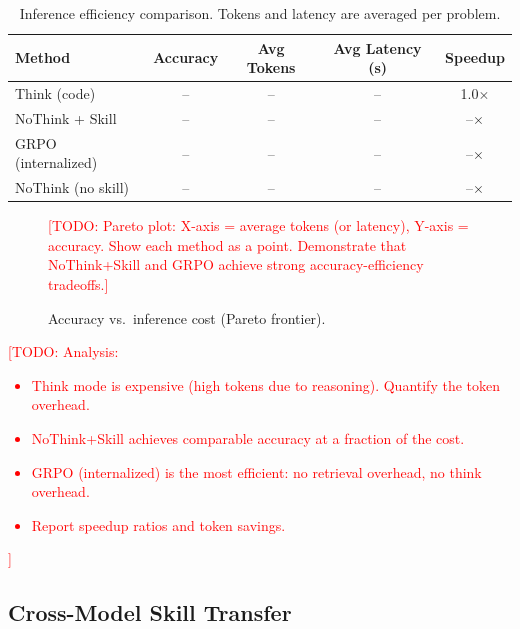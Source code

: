 \documentclass[11pt]{article}
\newcommand{\todo}[1]{\textcolor{red}{[TODO: #1]}}
\begin{document}

\begin{table}[t]
\centering
\caption{Inference efficiency comparison. Tokens and latency are averaged per problem.}
\label{tab:efficiency}
\small
\begin{tabular}{@{}lcccc@{}}
\toprule
\textbf{Method} & \textbf{Accuracy} & \textbf{Avg Tokens} & \textbf{Avg Latency (s)} & \textbf{Speedup} \\
\midrule
Think (code)          & -- & -- & -- & 1.0$\times$ \\
NoThink + Skill       & -- & -- & -- & --$\times$ \\
GRPO (internalized)   & -- & -- & -- & --$\times$ \\
NoThink (no skill)    & -- & -- & -- & --$\times$ \\
\bottomrule
\end{tabular}
\end{table}

\begin{figure}[t]
\centering
\todo{Pareto plot: X-axis = average tokens (or latency), Y-axis = accuracy. Show each method as a point. Demonstrate that NoThink+Skill and GRPO achieve strong accuracy-efficiency tradeoffs.}
\caption{Accuracy vs.\ inference cost (Pareto frontier).}
\label{fig:pareto}
\end{figure}

\todo{Analysis:
\begin{itemize}
    \item Think mode is expensive (high tokens due to reasoning). Quantify the token overhead.
    \item NoThink+Skill achieves comparable accuracy at a fraction of the cost.
    \item GRPO (internalized) is the most efficient: no retrieval overhead, no think overhead.
    \item Report speedup ratios and token savings.
\end{itemize}
}

\subsection{Cross-Model Skill Transfer}
\label{sec:exp_transfer}

\end{document}
